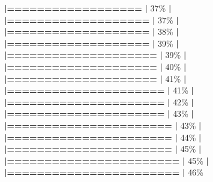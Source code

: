 \documentclass[
]{book}
\newenvironment{Shaded}{\begin{snugshade}}{\end{snugshade}}
\newcommand{\DecValTok}[1]{\textcolor[rgb]{0.00,0.00,0.81}{#1}}
\newcommand{\ErrorTok}[1]{\textcolor[rgb]{0.64,0.00,0.00}{\textbf{#1}}}
\newcommand{\NormalTok}[1]{#1}
\newcommand{\SpecialCharTok}[1]{\textcolor[rgb]{0.81,0.36,0.00}{\textbf{#1}}}
\begin{document}
\begin{Shaded}
\begin{Highlighting}[]
  \ErrorTok{|==================}                                \ErrorTok{|}  \DecValTok{37}\NormalTok{\%}
  \SpecialCharTok{|}                                                        
  \ErrorTok{|===================}                               \ErrorTok{|}  \DecValTok{37}\NormalTok{\%}
  \SpecialCharTok{|}                                                        
  \ErrorTok{|===================}                               \ErrorTok{|}  \DecValTok{38}\NormalTok{\%}
  \SpecialCharTok{|}                                                        
  \ErrorTok{|===================}                               \ErrorTok{|}  \DecValTok{39}\NormalTok{\%}
  \SpecialCharTok{|}                                                        
  \ErrorTok{|====================}                              \ErrorTok{|}  \DecValTok{39}\NormalTok{\%}
  \SpecialCharTok{|}                                                        
  \ErrorTok{|====================}                              \ErrorTok{|}  \DecValTok{40}\NormalTok{\%}
  \SpecialCharTok{|}                                                        
  \ErrorTok{|====================}                              \ErrorTok{|}  \DecValTok{41}\NormalTok{\%}
  \SpecialCharTok{|}                                                        
  \ErrorTok{|=====================}                             \ErrorTok{|}  \DecValTok{41}\NormalTok{\%}
  \SpecialCharTok{|}                                                        
  \ErrorTok{|=====================}                             \ErrorTok{|}  \DecValTok{42}\NormalTok{\%}
  \SpecialCharTok{|}                                                        
  \ErrorTok{|=====================}                             \ErrorTok{|}  \DecValTok{43}\NormalTok{\%}
  \SpecialCharTok{|}                                                        
  \ErrorTok{|======================}                            \ErrorTok{|}  \DecValTok{43}\NormalTok{\%}
  \SpecialCharTok{|}                                                        
  \ErrorTok{|======================}                            \ErrorTok{|}  \DecValTok{44}\NormalTok{\%}
  \SpecialCharTok{|}                                                        
  \ErrorTok{|======================}                            \ErrorTok{|}  \DecValTok{45}\NormalTok{\%}
  \SpecialCharTok{|}                                                        
  \ErrorTok{|=======================}                           \ErrorTok{|}  \DecValTok{45}\NormalTok{\%}
  \SpecialCharTok{|}                                                        
  \ErrorTok{|=======================}                           \ErrorTok{|}  \DecValTok{46}\NormalTok{\%}

\end{Highlighting}
\end{Shaded}
\end{document}
